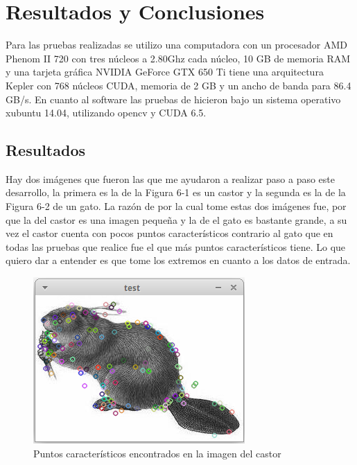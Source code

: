 \chapter{Resultados y Conclusiones}

Para las pruebas realizadas se utilizo una computadora con un procesador AMD Phenom II 720 con tres núcleos a 2.80Ghz cada núcleo, 10 GB de memoria RAM y una tarjeta gráfica NVIDIA GeForce GTX 650 Ti tiene una arquitectura Kepler con 768 núcleos CUDA, memoria de 2 GB y un ancho de banda para 86.4 GB/s. En cuanto al software las pruebas de hicieron bajo un sistema operativo xubuntu 14.04, utilizando opencv y CUDA 6.5.

\section{Resultados}

Hay dos imágenes que fueron las que me ayudaron a realizar paso a paso este desarrollo, la primera es la de la Figura 6-1 es un castor y la 
segunda es la de la Figura 6-2 de un gato. La razón de por la cual tome estas dos imágenes fue, por que la del castor es una imagen pequeña y la de el gato es bastante grande, a su vez el castor cuenta con pocos puntos característicos contrario al gato que en todas las pruebas que realice fue el que más puntos característicos tiene. Lo que quiero dar a entender es que tome los extremos en cuanto a los datos de entrada. 

\begin{figure}[ph]
			\centering
				\includegraphics[scale=1]{img/castor.png}
			\caption{Puntos característicos encontrados en la imagen del castor}
\end{figure}


